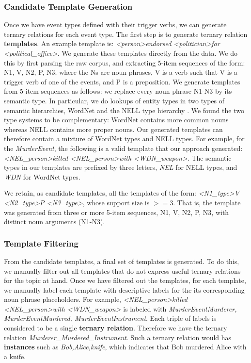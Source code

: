 \subsubsection{Candidate Template Generation} \label{candidates}
Once we have event types defined with their trigger verbs, we can  generate ternary relations
for each event type. The first step is to generate ternary relation \textbf{templates}. An example template is: \textit{ \textless person\textgreater	endorsed \textless politician\textgreater	for	\textless political\_office\textgreater}.  We generate these templates directly from the data. We do this by first parsing the raw corpus, and extracting 5-item sequences of the form:  N1, V, N2, P, N3; where the Ns are noun phrases,  V is a verb such that V is a trigger verb of one of the events,  and P is a preposition.
We generate templates from 5-item sequences as follows: we replace every noun phrase N1-N3 by its semantic type.
In particular, we do lookups of entity types in two types of semantic hierarchies, WordNet and the NELL type hierarchy \cite{Carlson2010}. We found the two type systems to be complementary: WordNet contains more common nouns whereas NELL contains more proper nouns.
Our generated templates can therefore contain a mixture of WordNet types and NELL types. For example, for the \textit{MurderEvent}, the following is a valid template that our approach generated: \textit{\textless NEL\_person\textgreater	killed	\textless NEL\_person\textgreater	with	\textless WDN\_weapon\textgreater}. The semantic types in our templates are prefixed by three letters, \textit{NEL} for NELL types, and \textit{WDN} for WordNet types.

We retain, as candidate templates, all the templates of the form:
\textit{\textless N1\_type\textgreater	V	\textless N2\_type\textgreater	P	\textless N3\_type\textgreater}, whose support size is $>=3$. That is, the template was generated from three or more  5-item sequences, N1, V, N2, P, N3, with distinct noun arguments (N1-N3).

\subsubsection{Template Filtering}\label{filteringandinstances}
From the candidate templates, a final set of templates is generated.
To do this, we manually filter out all templates that do not express useful
ternary relations for the topic at hand. Once we have filtered out the templates, for each
template, we manually label each template with  descriptive labels for the its corresponding 
noun phrase placeholders. For example, \textit{\textless NEL\_person\textgreater	killed	\textless NEL\_person\textgreater	with	\textless WDN\_weapon\textgreater} is labeled with \textit{MurderEventMurderer, MurderEventMurdered, MurderEventInstrument}. Each triple of labels is considered to  be a single \textbf{ternary relation}. Therefore we have the ternary relation \textit{Murderer\_Murdered\_Instrument}. Such a ternary relation would  has \textbf{instances} such as \textit{Bob,Alice,knife},  which indicates that Bob murdered Alice with a knife.

